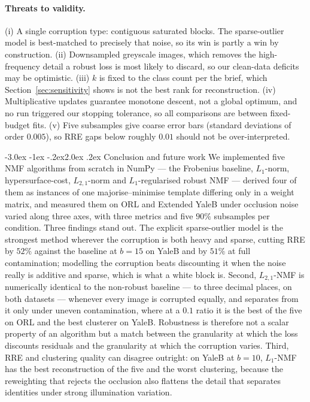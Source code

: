 \documentclass[12pt,a4paper]{article}
\makeatletter
\renewcommand\section{\@startsection{section}{1}{\z@}%
    {-3.0ex \@plus -1ex \@minus -.2ex}{2.0ex \@plus.2ex}%
    {\normalfont\fontsize{13}{15}\bfseries}}
\makeatother
\begin{document}
\paragraph{Threats to validity.} (i) A single corruption type: contiguous
saturated blocks. The sparse-outlier model is best-matched to precisely that
noise, so its win is partly a win by construction. (ii) Downsampled greyscale
images, which removes the high-frequency detail a robust loss is most likely to
discard, so our clean-data deficits may be optimistic. (iii) $k$ is fixed to
the class count per the brief, which Section~\ref{sec:sensitivity} shows is not
the best rank for reconstruction. (iv) Multiplicative updates guarantee
monotone descent, not a global optimum, and no run triggered our stopping
tolerance, so all comparisons are between fixed-budget fits. (v) Five
subsamples give coarse error bars (standard deviations of order $0.005$), so
RRE gaps below roughly $0.01$ should not be over-interpreted.

\section{Conclusion and future work}
\label{sec:conclusion}
We implemented five NMF algorithms from scratch in NumPy --- the Frobenius
baseline, $L_1$-norm, hypersurface-cost, $L_{2,1}$-norm and $L_1$-regularised
robust NMF --- derived four of them as instances of one majorise--minimise
template differing only in a weight matrix, and measured them on ORL and
Extended YaleB under occlusion noise varied along three axes, with three
metrics and five $90\%$ subsamples per condition. Three findings stand out.
The explicit sparse-outlier model is the strongest method wherever the
corruption is both heavy and sparse, cutting RRE by $52\%$ against the baseline
at $b=15$ on YaleB and by $51\%$ at full contamination; modelling the
corruption beats discounting it when the noise really is additive and sparse,
which is what a white block is. Second, $L_{2,1}$-NMF is numerically identical
to the non-robust baseline --- to three decimal places, on both datasets ---
whenever every image is corrupted equally, and separates from it only under
uneven contamination, where at a $0.1$ ratio it is the best of the five on ORL
and the best clusterer on YaleB. Robustness is therefore not a scalar property
of an algorithm but a match between the granularity at which the loss discounts
residuals and the granularity at which the corruption varies. Third, RRE and
clustering quality can disagree outright: on YaleB at $b=10$, $L_1$-NMF has the
best reconstruction of the five and the worst clustering, because the
reweighting that rejects the occlusion also flattens the detail that separates
identities under strong illumination variation.
\end{document}
